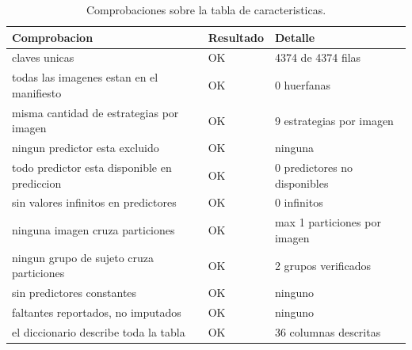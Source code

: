\begin{table}[H]
\centering
\small
\caption{Comprobaciones sobre la tabla de caracteristicas.}
\begin{tabular}{p{6.0cm}lp{5.0cm}}
\toprule
\textbf{Comprobacion} & \textbf{Resultado} & \textbf{Detalle} \\
\midrule
claves unicas & OK & 4374 de 4374 filas \\
todas las imagenes estan en el manifiesto & OK & 0 huerfanas \\
misma cantidad de estrategias por imagen & OK & 9 estrategias por imagen \\
ningun predictor esta excluido & OK & ninguna \\
todo predictor esta disponible en prediccion & OK & 0 predictores no disponibles \\
sin valores infinitos en predictores & OK & 0 infinitos \\
ninguna imagen cruza particiones & OK & max 1 particiones por imagen \\
ningun grupo de sujeto cruza particiones & OK & 2 grupos verificados \\
sin predictores constantes & OK & ninguno \\
faltantes reportados, no imputados & OK & ninguno \\
el diccionario describe toda la tabla & OK & 36 columnas descritas \\
\bottomrule
\end{tabular}
\end{table}

